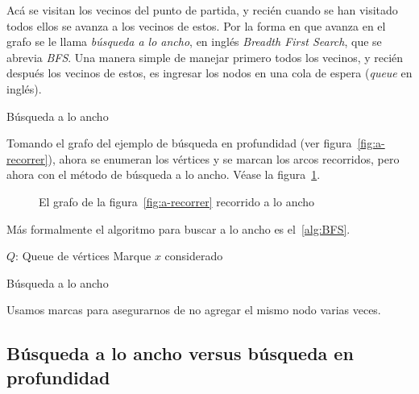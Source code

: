   Acá se visitan los vecinos del punto de partida,
  y recién cuando se han visitado todos ellos
  se avanza a los vecinos de estos.
  Por la forma en que avanza en el grafo
  se le llama \emph{búsqueda a lo ancho},
  en inglés \emph{\foreignlanguage{english}{Breadth First Search}},%
  que se abrevia \emph{BFS}.
  Una manera simple de manejar primero todos los vecinos,
  y recién después los vecinos de estos,
  es ingresar los nodos en una cola de espera
  (\emph{\foreignlanguage{english}{queue}} en inglés).

  \begin{example}
    Búsqueda a lo ancho

    Tomando el grafo del ejemplo de búsqueda en profundidad
    (ver figura~\ref{fig:a-recorrer}),
    ahora se enumeran los vértices y se marcan los arcos recorridos,
    pero ahora con el método de búsqueda a lo ancho.
    Véase la figura~\ref{fig:BFS}.
    \begin{figure}
      \centering
      \caption{El grafo de la figura~\ref{fig:a-recorrer}
	       recorrido a lo ancho}
      \label{fig:BFS}
    \end{figure}
  \end{example}
  Más formalmente el algoritmo
  para buscar a lo ancho es el~\ref{alg:BFS}.
  \begin{algorithm}[htbp]
    \DontPrintSemicolon

    \KwProcedure {} \;
    \BlankLine
    \KwVariables \(Q\): Queue de vértices \;
    \BlankLine
    Marque \(x\) considerado \;
     \;
    \caption{Búsqueda a lo ancho}
    \label{alg:BFS}
  \end{algorithm}
  Usamos marcas para asegurarnos de no agregar el mismo nodo varias veces.

\subsection{Búsqueda a lo ancho versus búsqueda en profundidad}
\label{sec:BFS+DFS}

